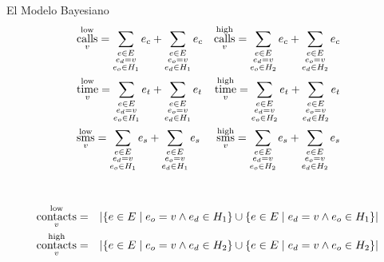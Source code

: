 \documentclass[usenames,dvipsnames,table]{beamer}
\DeclareMathOperator{\calls}{calls}
\DeclareMathOperator{\etime}{time}
\DeclareMathOperator{\sms}{sms}
\DeclareMathOperator{\contacts}{contacts}
\DeclareMathOperator{\low}{low}
\DeclareMathOperator{\high}{high}
\begin{document}
\begin{frame}{El Modelo Bayesiano}
	\begin{gather*}
		\begin{aligned}
			& \calls^{\low}_v = \sum_{\substack{e \in E \\ e_d = v \\ e_o \in H_1}}{e_c} + \sum_{\substack{e \in E \\ e_o = v \\ e_d \in H_1}}{e_c}
			& \calls^{\high}_v = \sum_{\substack{e \in E \\ e_d = v \\ e_o \in H_2}}{e_c} + \sum_{\substack{e \in E \\ e_o = v \\ e_d \in H_2}}{e_c} \\
			& \etime^{\low}_v = \sum_{\substack{e \in E \\ e_d = v \\ e_o \in H_1}}{e_t} + \sum_{\substack{e \in E \\ e_o = v \\ e_d \in H_1}}{e_t}
			& \etime^{\high}_v = \sum_{\substack{e \in E \\ e_d = v \\ e_o \in H_2}}{e_t} + \sum_{\substack{e \in E \\ e_o = v \\ e_d \in H_2}}{e_t} \\
			& \sms^{\low}_v = \sum_{\substack{e \in E \\ e_d = v \\ e_o \in H_1}}{e_s} + \sum_{\substack{e \in E \\ e_o = v \\ e_d \in H_1}}{e_s}
			& \sms^{\high}_v = \sum_{\substack{e \in E \\ e_d = v \\ e_o \in H_2}}{e_s} + \sum_{\substack{e \in E \\ e_o = v \\ e_d \in H_2}}{e_s}
		\end{aligned} \\
		\vspace{1em} \\
		\begin{aligned}
			\contacts^{\low}_v &= &\left| \left\{ e \in E \mid e_o = v \land e_d \in H_1 \right\} \cup \left\{ e \in E \mid e_d = v \land e_o \in H_1 \right\} \right| \\
			\contacts^{\high}_v &= &\left| \left\{ e \in E \mid e_o = v \land e_d \in H_2 \right\} \cup \left\{ e \in E \mid e_d = v \land e_o \in H_2 \right\} \right|
		\end{aligned}
	\end{gather*}
\end{frame}
\end{document}
